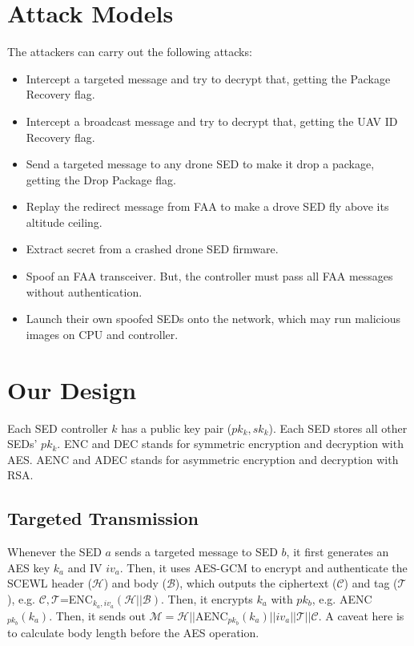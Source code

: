 \documentclass[11pt,oneside,onecolumn,letterpaper]{article}
\begin{document}
\section{Attack Models}

The attackers can carry out the following attacks:

\begin{itemize}
	\item Intercept a targeted message and try to decrypt that, getting the Package Recovery flag.

	\item Intercept a broadcast message and try to decrypt that, getting the UAV ID Recovery flag.	
	
	\item Send a targeted message to any drone SED to make it drop a package, getting the Drop Package flag.		
	
	\item Replay the redirect message from FAA to make a drove SED fly above its altitude ceiling.
	
	\item Extract secret from a crashed drone SED firmware.  
	
	\item Spoof an FAA transceiver. But, the controller must pass all FAA messages without authentication.
	
	\item Launch their own spoofed SEDs onto the network, which may run malicious images on CPU and controller.
\end{itemize}

\section{Our Design}
Each SED controller $k$ has a public key pair ($pk_k, sk_k$).
Each SED stores all other SEDs' $pk_k$.
ENC and DEC stands for symmetric encryption and decryption with AES.
AENC and ADEC stands for asymmetric encryption and decryption with RSA.

\subsection{Targeted Transmission}
Whenever the SED $a$ sends a targeted message to SED $b$, it first generates an AES key $k_a$ and IV $iv_a$. 
Then, it uses AES-GCM to encrypt and authenticate the SCEWL header ($\mathcal{H}$) and body ($\mathcal{B}$), which outputs the ciphertext ($\mathcal{C}$) and tag ($\mathcal{T}$), e.g. $\mathcal{C}, \mathcal{T}$=ENC$_{k_a, iv_a}(\mathcal{H} || \mathcal{B})$.
Then, it encrypts $k_a$ with $pk_b$, e.g. AENC$_{pk_b}(k_a)$.
Then, it sends out $\mathcal{M}=\mathcal{H} || $AENC$_{pk_b}(k_a)||iv_a||\mathcal{T}||\mathcal{C}$.
A caveat here is to calculate body length before the AES operation.
\end{document}
